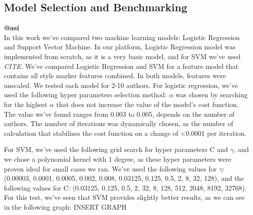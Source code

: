 \documentclass[a4paper]{article}
\begin{document}
\subsection{Model Selection and Benchmarking}
\textbf{@asi}\\
In this work we've compared two machine learning models: Logistic Regression and Support Vector Machine.
In our platform, Logistic Regression model was implemented from scratch, as it is a very basic model, and for SVM we've used \emph{CITE}.
We've compared Logistic Regression and SVM for a feature model that contains all style marker features combined.
In both models, features were unscaled.
We tested each model for 2-10 authors.
For logistic regression, we've used the following hyper parameters selection method:
$\alpha$ was chosen by searching for the highest $\alpha$ that does not increase the value of the model's cost function. The value we've found ranges from 0.003 to 0.005, depends on the number of authors.
The number of iterations was dynamically chosen, as the number of calculation that stabilizes the cost function on a change of \textless 0.0001 per iteration.

For SVM, we've used the following grid search for hyper parameters C and $\gamma$, and we chose a polynomial kernel with 1 degree, as these hyper parameters were proven ideal for small cases we ran.
We've used the following values for $\gamma$: (0.00003, 0.0001, 0.0005, 0.002, 0.008, 0.03125, 0.125, 0.5, 2, 8, 32, 128), and the following values for C: (0.03125, 0.125, 0.5, 2, 32, 8, 128, 512, 2048, 8192, 32768).
For this test, we've seen that SVM provides slightly better results, as we can see in the following graph:
INSERT GRAPH
\end{document}
